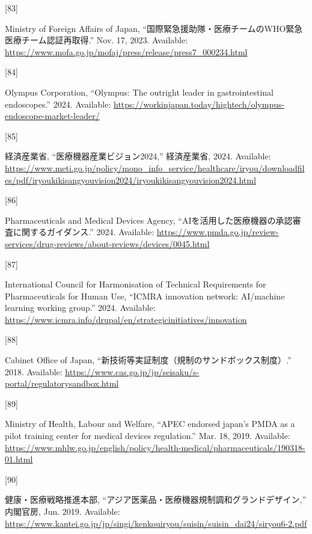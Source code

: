 \documentclass[
  a4paper,
  a4paper,
  11pt]{ltjsbook}
\newlength{\cslhangindent}
\newlength{\csllabelwidth}
\newenvironment{CSLReferences}[2] %
 {\begin{list}{}{%
  \setlength{\itemindent}{0pt}
  \setlength{\leftmargin}{0pt}
  \setlength{\parsep}{0pt}
  \ifodd #1
   \setlength{\leftmargin}{\cslhangindent}
   \setlength{\itemindent}{-1\cslhangindent}
  \fi
  \setlength{\itemsep}{#2\baselineskip}}}
 {\end{list}}
\newcommand{\CSLLeftMargin}[1]{\parbox[t]{\csllabelwidth}{\strut#1\strut}}
\newcommand{\CSLRightInline}[1]{\parbox[t]{\linewidth - \csllabelwidth}{\strut#1\strut}}
\begin{document}
\begin{CSLReferences}{0}{0}
\CSLLeftMargin{{[}83{]} }%
\CSLRightInline{Ministry of Foreign Affairs of Japan,
{``国際緊急援助隊・医療チームのWHO緊急医療チーム認証再取得.''} Nov. 17,
2023. Available:
\url{https://www.mofa.go.jp/mofaj/press/release/press7_000234.html}}

\CSLLeftMargin{{[}84{]} }%
\CSLRightInline{Olympus Corporation, {``Olympus: The outright leader in
gastrointestinal endoscopes.''} 2024. Available:
\url{https://workinjapan.today/hightech/olympus-endoscope-market-leader/}}

\CSLLeftMargin{{[}85{]} }%
\CSLRightInline{経済産業省, {``医療機器産業ビジョン2024,''} 経済産業省,
2024. Available:
\url{https://www.meti.go.jp/policy/mono_info_service/healthcare/iryou/downloadfiles/pdf/iryoukikisangyouvision2024/iryoukikisangyouvision2024.html}}

\CSLLeftMargin{{[}86{]} }%
\CSLRightInline{Pharmaceuticals and Medical Devices Agency,
{``AIを活用した医療機器の承認審査に関するガイダンス.''} 2024. Available:
\url{https://www.pmda.go.jp/review-services/drug-reviews/about-reviews/devices/0045.html}}

\CSLLeftMargin{{[}87{]} }%
\CSLRightInline{International Council for Harmonisation of Technical
Requirements for Pharmaceuticals for Human Use, {``ICMRA innovation
network: AI/machine learning working group.''} 2024. Available:
\url{https://www.icmra.info/drupal/en/strategicinitiatives/innovation}}

\CSLLeftMargin{{[}88{]} }%
\CSLRightInline{Cabinet Office of Japan,
{``新技術等実証制度（規制のサンドボックス制度）.''} 2018. Available:
\url{https://www.cas.go.jp/jp/seisaku/s-portal/regulatorysandbox.html}}

\CSLLeftMargin{{[}89{]} }%
\CSLRightInline{Ministry of Health, Labour and Welfare, {``APEC endorsed
japan's PMDA as a pilot training center for medical devices
regulation.''} Mar. 18, 2019. Available:
\url{https://www.mhlw.go.jp/english/policy/health-medical/pharmaceuticals/190318-01.html}}

\CSLLeftMargin{{[}90{]} }%
\CSLRightInline{健康・医療戦略推進本部,
{``アジア医薬品・医療機器規制調和グランドデザイン,''} 内閣官房, Jun.
2019. Available:
\url{https://www.kantei.go.jp/jp/singi/kenkouiryou/suisin/suisin_dai24/siryou6-2.pdf}}


\end{CSLReferences}
\end{document}
